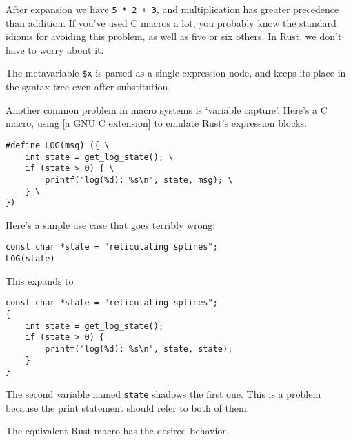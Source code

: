 \documentclass[a4paper,]{book}
\newenvironment{Shaded}{\begin{snugshade}}{\end{snugshade}}
\newcommand{\KeywordTok}[1]{\textcolor[rgb]{0.13,0.29,0.53}{\textbf{{#1}}}}
\newcommand{\DecValTok}[1]{\textcolor[rgb]{0.00,0.00,0.81}{{#1}}}
\newcommand{\PreprocessorTok}[1]{\textcolor[rgb]{0.56,0.35,0.01}{\textit{{#1}}}}
\newcommand{\NormalTok}[1]{{#1}}
\begin{document}
After expansion we have \texttt{5\ *\ 2\ +\ 3}, and multiplication has
greater precedence than addition. If you've used C macros a lot, you
probably know the standard idioms for avoiding this problem, as well as
five or six others. In Rust, we don't have to worry about it.

\begin{Shaded}
\end{Shaded}

The metavariable \texttt{\$x} is parsed as a single expression node, and
keeps its place in the syntax tree even after substitution.

Another common problem in macro systems is `variable capture'. Here's a
C macro, using {[}a GNU C extension{]} to emulate Rust's expression
blocks.

\begin{verbatim}
#define LOG(msg) ({ \
    int state = get_log_state(); \
    if (state > 0) { \
        printf("log(%d): %s\n", state, msg); \
    } \
})
\end{verbatim}

Here's a simple use case that goes terribly wrong:

\begin{verbatim}
const char *state = "reticulating splines";
LOG(state)
\end{verbatim}

This expands to

\begin{verbatim}
const char *state = "reticulating splines";
{
    int state = get_log_state();
    if (state > 0) {
        printf("log(%d): %s\n", state, state);
    }
}
\end{verbatim}

The second variable named \texttt{state} shadows the first one. This is
a problem because the print statement should refer to both of them.

The equivalent Rust macro has the desired behavior.
\end{document}
